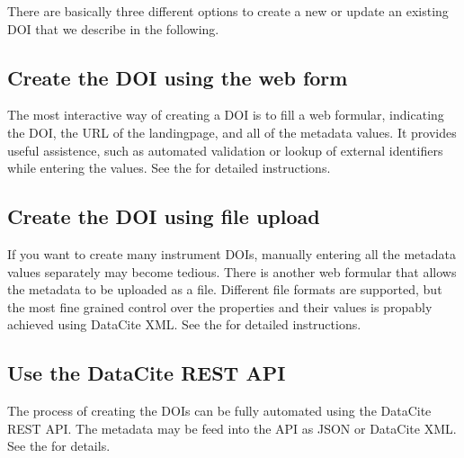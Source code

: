 \documentclass[a4paper,10pt,english]{sphinxmanual}
\begin{document}
\sphinxAtStartPar
There are basically three different options to create a new or update
an existing DOI that we describe in the following.


\subsection{Create the DOI using the web form}
\label{\detokenize{datacite-cookbook/minting:create-the-doi-using-the-web-form}}
\sphinxAtStartPar
The most interactive way of creating a DOI is to fill a web formular,
indicating the DOI, the URL of the landingpage, and all of the
metadata values.  It provides useful assistence, such as automated
validation or lookup of external identifiers while entering the
values.  See the 
for detailed instructions.


\subsection{Create the DOI using file upload}
\label{\detokenize{datacite-cookbook/minting:create-the-doi-using-file-upload}}
\sphinxAtStartPar
If you want to create many instrument DOIs, manually entering all the
metadata values separately may become tedious.  There is another web
formular that allows the metadata to be uploaded as a file.  Different
file formats are supported, but the most fine grained control over the
properties and their values is propably achieved using DataCite XML.
See the 
for detailed instructions.


\subsection{Use the DataCite REST API}
\label{\detokenize{datacite-cookbook/minting:use-the-datacite-rest-api}}
\sphinxAtStartPar
The process of creating the DOIs can be fully automated using the
DataCite REST API.  The metadata may be feed into the API as JSON or
DataCite XML.  See the  for details.



\renewcommand{\indexname}{Index}
\printindex
\end{document}
